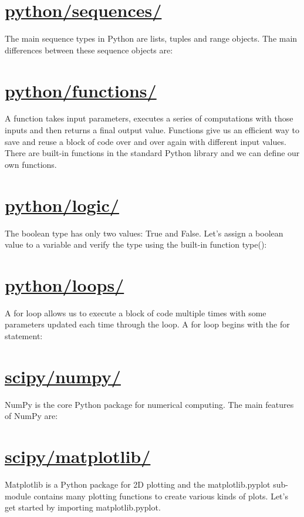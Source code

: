 \documentclass[12pt]{article}
\begin{document}
\section{\href{https://patrickwalls.github.io/mathematicalpython/python/sequences/}{python/sequences/}}
The main sequence types in Python are lists, tuples and range objects. The main differences between these sequence objects are:
\vspace{1cm}
\section{\href{https://patrickwalls.github.io/mathematicalpython/python/functions/}{python/functions/}}
A function takes input parameters, executes a series of computations with those inputs and then returns a final output value. Functions give us an efficient way to save and reuse a block of code over and over again with different input values. There are built-in functions in the standard Python library and we can define our own functions.
\vspace{1cm}
\section{\href{https://patrickwalls.github.io/mathematicalpython/python/logic/}{python/logic/}}
The boolean type has only two values: True and False. Let's assign a boolean value to a variable and verify the type using the built-in function type():
\vspace{1cm}
\section{\href{https://patrickwalls.github.io/mathematicalpython/python/loops/}{python/loops/}}
A for loop allows us to execute a block of code multiple times with some parameters updated each time through the loop. A for loop begins with the for statement:
\vspace{1cm}
\section{\href{https://patrickwalls.github.io/mathematicalpython/scipy/numpy/}{scipy/numpy/}}
NumPy is the core Python package for numerical computing. The main features of NumPy are:
\vspace{1cm}
\section{\href{https://patrickwalls.github.io/mathematicalpython/scipy/matplotlib/}{scipy/matplotlib/}}
Matplotlib is a Python package for 2D plotting and the matplotlib.pyplot sub-module contains many plotting functions to create various kinds of plots. Let's get started by importing matplotlib.pyplot.
\vspace{1cm}
\end{document}
